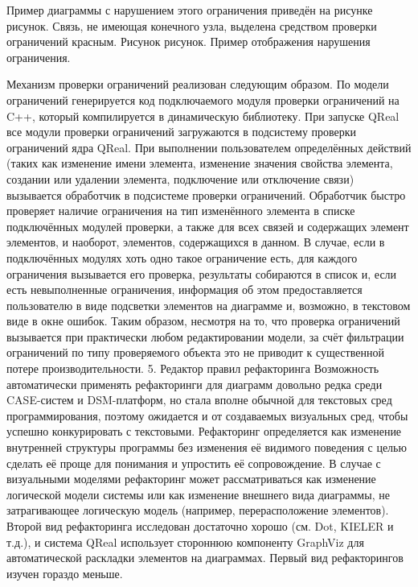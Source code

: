 	Пример диаграммы с нарушением этого ограничения приведён на рисунке рисунок. Связь, не имеющая конечного узла, выделена средством проверки ограничений красным.
Рисунок рисунок. Пример отображения нарушения ограничения.

Механизм проверки ограничений реализован следующим образом. По модели ограничений генерируется код подключаемого модуля проверки ограничений на C++, который компилируется в динамическую библиотеку. При запуске QReal все модули проверки ограничений загружаются в подсистему проверки ограничений ядра QReal. При выполнении пользователем определённых действий (таких как изменение имени элемента, изменение значения свойства элемента, создании или удалении элемента, подключение или отключение связи) вызывается обработчик в подсистеме проверки ограничений. Обработчик быстро проверяет наличие ограничения на тип изменённого элемента в списке подключённых модулей проверки, а также для всех связей и содержащих элемент элементов, и наоборот, элементов, содержащихся в данном. В случае, если в подключённых модулях хоть одно такое ограничение есть, для каждого ограничения вызывается его проверка, результаты собираются в список и, если есть невыполненные ограничения, информация об этом предоставляется пользователю в виде подсветки элементов на диаграмме и, возможно, в текстовом виде в окне ошибок. Таким образом, несмотря на то, что проверка ограничений вызывается при практически любом редактировании модели, за счёт фильтрации ограничений по типу проверяемого объекта это не приводит к существенной потере производительности.
5. Редактор правил рефакторинга
	Возможность автоматически применять рефакторинги для диаграмм довольно редка среди CASE-систем и DSM-платформ, но стала вполне обычной для текстовых сред программирования, поэтому ожидается и от создаваемых визуальных сред, чтобы успешно конкурировать с текстовыми. Рефакторинг определяется как изменение внутренней структуры программы без изменения её видимого поведения с целью сделать её проще для понимания и упростить её сопровождение. В случае с визуальными моделями рефакторинг может рассматриваться как изменение логической модели системы или как изменение внешнего вида диаграммы, не затрагивающее логическую модель (например, перерасположение элементов). Второй вид рефакторинга исследован достаточно хорошо (см. Dot, KIELER и т.д.), и система QReal использует стороннюю компоненту GraphViz для автоматической раскладки элементов на диаграммах. Первый вид рефакторингов изучен гораздо меньше.
